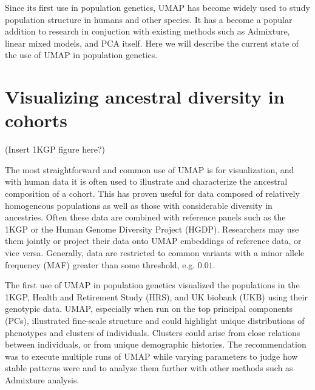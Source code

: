 \documentclass[12pt]{article}
\begin{document}
Since its first use in population genetics, UMAP has become widely used to study population structure in humans and other species. It has a become a popular addition to research in conjuction with existing methods such as Admixture, linear mixed models, and PCA itself. Here we will describe the current state of the use of UMAP in population genetics.



\section*{Visualizing ancestral diversity in cohorts}
(Insert 1KGP figure here?)

The most straightforward and common use of UMAP is for visualization, and with human data it is often used to illustrate and characterize the ancestral composition of a cohort. This has proven useful for data composed of relatively homogeneous populations as well as those with considerable diversity in ancestries. Often these data are combined with reference panels such as the 1KGP or the Human Genome Diversity Project (HGDP)\cite{cann2002human}. Researchers may use them jointly or project their data onto UMAP embeddings of reference data, or vice versa. Generally, data are restricted to common variants with a minor allele frequency (MAF) greater than some threshold, e.g. $0.01$.

The first use of UMAP in population genetics visualized the populations in the 1KGP, Health and Retirement Study (HRS)\cite{juster1995overview}, and UK biobank (UKB)\cite{sudlow2015uk} using their genotypic data. UMAP, especially when run on the top principal components (PCs), illustrated fine-scale structure and could highlight unique distributions of phenotypes and clusters of individuals. Clusters could arise from close relations between individuals, or from unique demographic histories. The recommendation was to execute multiple runs of UMAP while varying parameters to judge how stable patterns were and to analyze them further with other methods such as Admixture analysis\cite{diaz-papkovich_umap_2019}.
\end{document}
